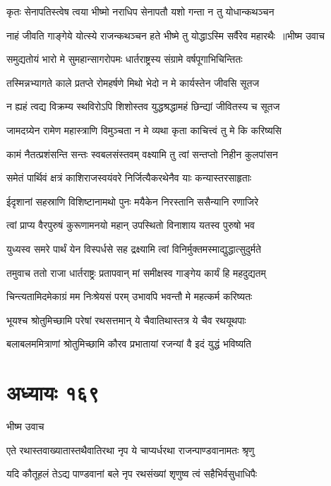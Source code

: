 \twolineshloka
{कृतः सेनापतिस्त्वेष त्वया भीष्मो नराधिप}
{सेनापतौ यशो गन्ता न तु योधान्कथञ्चन}


\threelineshloka
{नाहं जीवति गाङ्गेये योत्स्ये राजन्कथञ्चन}
{हते भीष्मे तु योद्धाऽस्मि सर्वैरेव महारथैः ॥भीष्म उवाच}
{}


\twolineshloka
{समुद्यतोयं भारो मे सुमहान्सागरोपमः}
{धार्तराष्ट्रस्य संग्रामे वर्षपूगाभिचिन्तितः}


\twolineshloka
{तस्मिन्नभ्यागते काले प्रतप्ते रोमहर्षणे}
{मिथो भेदो न मे कार्यस्तेन जीवसि सूतज}


\twolineshloka
{न ह्यहं त्वद्य विक्रम्य स्थविरोऽपि शिशोस्तव}
{युद्धश्रद्धामहं छिन्द्यां जीवितस्य च सूतज}


\twolineshloka
{जामदग्र्येन रामेण महास्त्राणि विमुञ्चता}
{न मे व्यथा कृता काचित्त्वं तु मे कि करिष्यसि}


\twolineshloka
{कामं नैतत्प्रशंसन्ति सन्तः स्वबलसंस्तवम्}
{वक्ष्यामि तु त्वां सन्तप्तो निहीन कुलपांसन}


\twolineshloka
{समेतं पार्थिवं क्षत्रं काशिराजस्वयंवरे}
{निर्जित्यैकरथेनैव याः कन्यास्तरसाहृताः}


\twolineshloka
{ईदृशानां सहस्राणि विशिष्टानामथो पुनः}
{मयैकेन निरस्तानि ससैन्यानि रणाजिरे}


\twolineshloka
{त्वां प्राप्य वैरपुरुषं कुरूणामनयो महान्}
{उपस्थितो विनाशाय यतस्व पुरुषो भव}


\twolineshloka
{युध्यस्व समरे पार्थं येन विस्पर्धसे सह}
{द्रक्ष्यामि त्वां विनिर्मुक्तमस्माद्युद्धात्सुदुर्मते}


\twolineshloka
{तमुवाच ततो राजा धार्तराष्ट्रः प्रतापवान्}
{मां समीक्षस्व गाङ्गेय कार्यं हि महदुद्यतम्}


\twolineshloka
{चिन्त्यतामिदमेकाग्रं मम निःश्रेयसं परम्}
{उभावपि भवन्तौ मे महत्कर्म करिष्यतः}


\twolineshloka
{भूयश्च श्रोतुमिच्छामि परेषां रथसत्तमान्}
{ये चैवातिथास्तत्र ये चैव रथयूथपाः}


\twolineshloka
{बलाबलममित्राणां श्रोतुमिच्छामि कौरव}
{प्रभातायां रजन्यां वै इदं युद्धं भविष्यति}


\chapter{अध्यायः १६९}
\twolineshloka
{भीष्म उवाच}
{}


\twolineshloka
{एते रथास्तवाख्यातास्तथैवातिरथा नृप}
{ये चाप्यर्धरथा राजन्पाण्डवानामतः श्रृणु}


\twolineshloka
{यदि कौतूहलं तेऽद्य पाण्डवानां बले नृप}
{रथसंख्यां शृणुष्व त्वं सहैभिर्वसुधाधिपैः}


